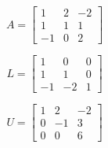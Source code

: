 \[
A=\left[
\begin{array}{ccc}
1 & 2 & -2 \\
1 & 1 & 1\\
-1 & 0 & 2
\end{array}\right]
\]
\bigskip

\[ 
L=\left[
\begin{array}{ccc}
1 & 0 & 0 \\
1 & 1 & 0\\
-1 & -2 & 1
\end{array}
\right]
\]

\[ 
U=\left[
\begin{array}{ccc}
 1& 2 & -2 \\
 0 & -1 & 3 \\
 0 & 0 & 6
\end{array}
\right] 
\]
